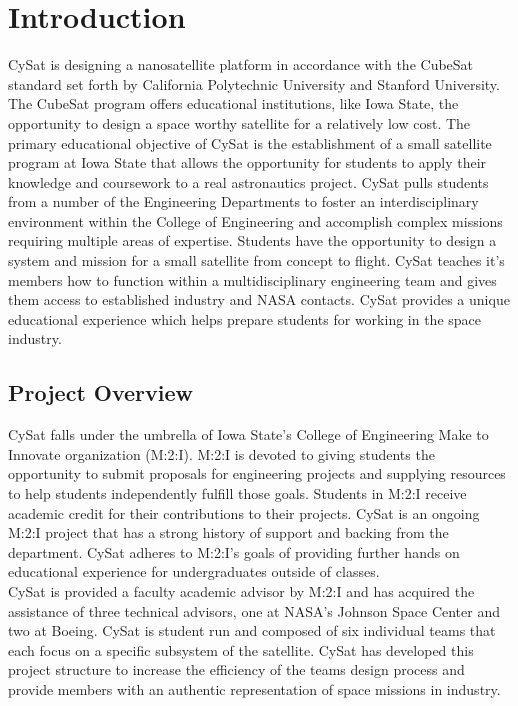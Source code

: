 \documentclass[nocover]            %
{CSLI}                       %
\begin{document}
\newpage
\tableofcontents



\newpage
\section{Introduction}
CySat is designing a nanosatellite platform in accordance with the CubeSat standard set forth by California Polytechnic University and Stanford University. The CubeSat program offers educational institutions, like Iowa State, the opportunity to design a space worthy satellite for a relatively low cost. The primary educational objective of CySat is the establishment of a small satellite program at Iowa State that allows the opportunity for students to apply their knowledge and coursework to a real astronautics project. CySat pulls students from a number of the Engineering Departments to foster an interdisciplinary environment within the College of Engineering and accomplish complex missions requiring multiple areas of expertise. Students have the opportunity to design a system and mission for a small satellite from concept to flight. CySat teaches it's members how to function within a multidisciplinary engineering team and gives them access to established industry and NASA contacts.  CySat provides a unique educational experience which helps prepare students for working in the space industry.
\subsection{Project Overview}
CySat falls under the umbrella of Iowa State's College of Engineering Make to Innovate organization (M:2:I). M:2:I is devoted to giving students the opportunity to submit proposals for engineering projects and supplying resources to help students independently fulfill those goals. Students in M:2:I receive academic credit for their contributions to their projects. CySat is an ongoing M:2:I project that has a strong history of support and backing from the department. CySat adheres to M:2:I's goals of providing further hands on educational experience for undergraduates outside of classes.\\
CySat is provided a faculty academic advisor by M:2:I and has acquired the assistance of three technical advisors, one at NASA's Johnson Space Center and two at Boeing. CySat is student run and composed of six individual teams that each focus on a specific subsystem of the satellite. CySat has developed this project structure to increase the efficiency of the teams design process and provide members with an authentic representation of space missions in industry.
\end{document}
